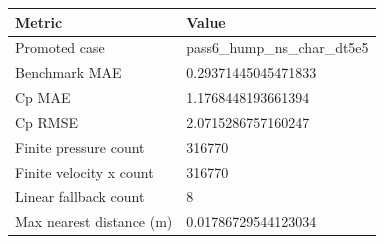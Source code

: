 \begin{tabular}{ll}
\toprule
Metric & Value\\
\midrule
Promoted case & pass6\_hump\_ns\_char\_dt5e5\\
Benchmark MAE & 0.29371445045471833\\
Cp MAE & 1.1768448193661394\\
Cp RMSE & 2.0715286757160247\\
Finite pressure count & 316770\\
Finite velocity x count & 316770\\
Linear fallback count & 8\\
Max nearest distance (m) & 0.01786729544123034\\
\bottomrule
\end{tabular}
